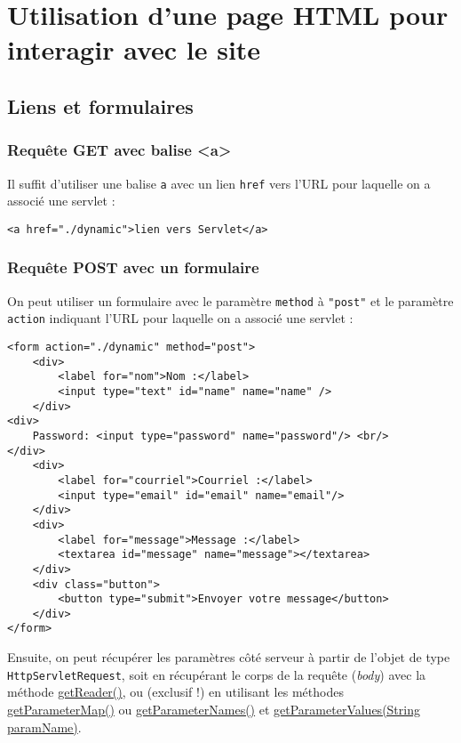 \documentclass[11pt]{article}
\begin{document}
\section{Utilisation d'une page HTML pour interagir avec le site}
\label{sec:orgdb90ebd}



\subsection{Liens et formulaires}
\label{sec:org81d70ba}
\subsubsection{Requête GET avec balise <a>}
\label{sec:orgff0afbd}

Il suffit d'utiliser une balise \texttt{a} avec un lien \texttt{href} vers l'URL pour laquelle
on a associé une servlet :
\begin{verbatim}
<a href="./dynamic">lien vers Servlet</a>
\end{verbatim}

\subsubsection{Requête POST avec un formulaire}
\label{sec:org96b359f}
On peut utiliser un formulaire avec le paramètre \texttt{method} à \texttt{"post"} et le
paramètre \texttt{action} indiquant l'URL pour laquelle on a associé une servlet :
\begin{verbatim}
<form action="./dynamic" method="post">
    <div>
        <label for="nom">Nom :</label>
        <input type="text" id="name" name="name" />
    </div>
<div>
    Password: <input type="password" name="password"/> <br/>
</div>
    <div>
        <label for="courriel">Courriel :</label>
        <input type="email" id="email" name="email"/>
    </div>
    <div>
        <label for="message">Message :</label>
        <textarea id="message" name="message"></textarea>
    </div>
    <div class="button">
        <button type="submit">Envoyer votre message</button>
    </div>
</form>
\end{verbatim}

Ensuite, on peut récupérer les paramètres côté serveur à partir de l'objet de
type \texttt{HttpServletRequest}, soit en récupérant le corps de la requête (\emph{body})
avec la méthode \href{https://tomcat.apache.org/tomcat-5.5-doc/servletapi/javax/servlet/ServletRequest.html#getReader()}{getReader()}, ou (exclusif !) en utilisant les
méthodes \href{https://tomcat.apache.org/tomcat-5.5-doc/servletapi/javax/servlet/ServletRequest.html#getParameterMap()}{getParameterMap()} ou \href{https://tomcat.apache.org/tomcat-5.5-doc/servletapi/javax/servlet/ServletRequest.html#getParameterNames()}{getParameterNames()} et \href{https://tomcat.apache.org/tomcat-5.5-doc/servletapi/javax/servlet/ServletRequest.html#getParameterValues(java.lang.String)}{getParameterValues(String
paramName)}.
\end{document}
